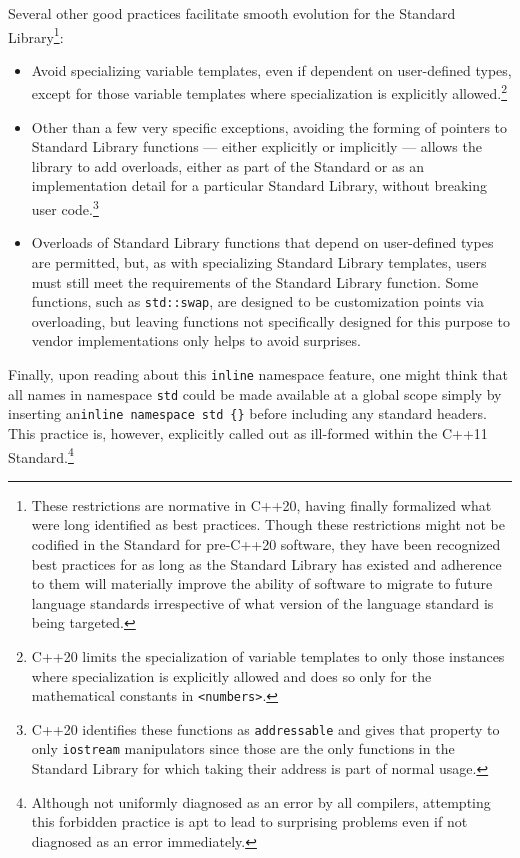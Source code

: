 Several other good practices facilitate smooth evolution for the
Standard Library{\cprotect\footnote{These restrictions are normative in
C++20, having finally formalized what were long identified as best
practices. Though these restrictions might not be codified in the
Standard for pre-C++20 software, they have been recognized best
practices for as long as the Standard Library has existed and
adherence to them will materially improve the ability of software to
migrate to future language standards irrespective of what version of
  the language standard is being targeted.}}:
\begin{itemize}
\item{Avoid specializing variable templates, even if dependent on user-defined types, except for those variable templates where specialization is explicitly allowed.\cprotect\footnote{C++20 limits the specialization of variable templates to only those instances where specialization is explicitly allowed and does so only for the mathematical constants in \lstinline!<numbers>!.}}
\item{Other than a few very specific exceptions, avoiding the forming of pointers to Standard Library functions — either explicitly or implicitly — allows the library to add overloads, either as part of the Standard or as an implementation detail for a particular Standard Library, without breaking user code.\cprotect\footnote{C++20 identifies these functions as \lstinline!addressable! and gives that property to only \lstinline!iostream! manipulators since those are the only functions in the Standard Library for which taking their address is part of normal usage.}}
\item{Overloads of Standard Library functions that depend on user-defined types are permitted, but, as with specializing Standard Library templates, users must still meet the requirements of the Standard Library function. Some functions, such as \lstinline!std::swap!, are designed to be customization points via overloading, but leaving functions not specifically designed for this purpose to vendor implementations only helps to avoid surprises.}
\end{itemize}

Finally, upon reading about this \lstinline!inline! namespace feature, one
might think that all names in namespace \lstinline!std! could be made
available at a global scope simply by inserting an\linebreak[4]%
\lstinline!inline!~\lstinline!namespace!~\lstinline!std!~\lstinline!{}! before
including any standard headers. This practice is, however, explicitly
called out as ill-formed within the C++11 Standard.\footnote{Although not uniformly diagnosed as an error by
all compilers, attempting this forbidden practice is apt to lead to
surprising problems even if not diagnosed as an error immediately.}

